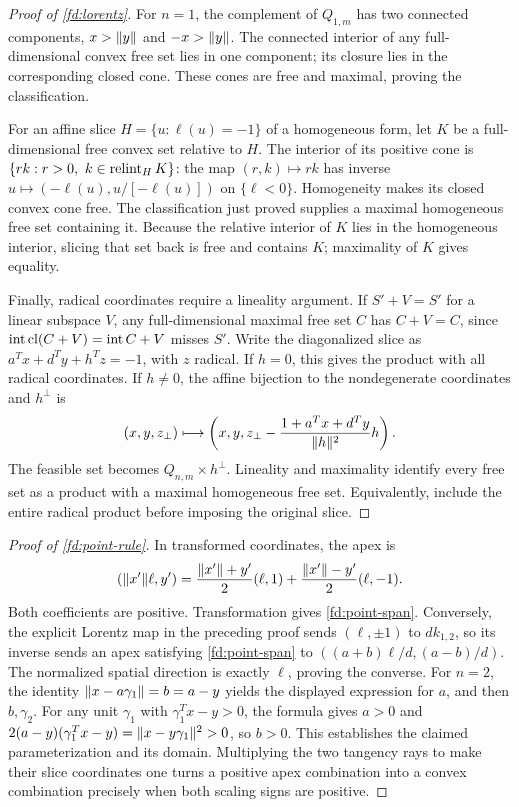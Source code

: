 \begin{proof}[Proof of \cref{fd:lorentz}]
For $n=1$, the complement of $Q_{1,m}$ has two connected components,
$x>\lVert y\rVert$ and $-x>\lVert y\rVert$. The connected interior of any
full-dimensional convex free set lies in one component; its
closure lies in the corresponding closed cone. These cones are
free and maximal, proving the classification.

For an affine slice $H=\{u:\ell(u)=-1\}$ of a homogeneous form,
let $K$ be a full-dimensional free convex set relative to $H$.
The interior of its positive cone is
$\{rk:r>0,\ k\in\operatorname{relint}_H K\}$: the map $(r,k)\mapsto rk$
has inverse $u\mapsto(-\ell(u),u/[-\ell(u)])$ on $\{\ell<0\}$.
Homogeneity makes its closed convex cone free. The classification
just proved supplies a maximal homogeneous free set containing it.
Because the relative interior of $K$ lies in the homogeneous
interior, slicing that set back is free and contains $K$;
maximality of $K$ gives equality.

Finally, radical coordinates require a lineality argument.
If $S'+V=S'$ for a linear subspace $V$, any full-dimensional maximal
free set $C$ has $C+V=C$, since
$\operatorname{int}\operatorname{cl}(C+V)=\operatorname{int} C+V$ misses $S'$. Write the diagonalized slice
as $a^Tx+d^Ty+h^Tz=-1$, with $z$ radical. If $h=0$, this gives
the product with all radical coordinates. If $h\ne0$, the affine
bijection to the nondegenerate coordinates and $h^\perp$ is
\[
 (x,y,z_\perp)\longmapsto
 \left(x,y,z_\perp-\frac{1+a^Tx+d^Ty}{\lVert h\rVert^2}h\right).
\]
The feasible set becomes $Q_{n,m}\times h^\perp$. Lineality and
maximality identify every free set as a product with a maximal
homogeneous free set. Equivalently, include the entire radical
product before imposing the original slice.
\end{proof}

\begin{proof}[Proof of \cref{fd:point-rule}]
\label{fd:point-rule-proof}
In transformed coordinates, the apex is
\[
 (\lVert x'\rVert\ell,y')
 =\frac{\lVert x'\rVert+y'}2(\ell,1)
  +\frac{\lVert x'\rVert-y'}2(\ell,-1).
\]
Both coefficients are positive. Transformation gives
\cref{fd:point-span}. Conversely, the explicit Lorentz map in
the preceding proof sends $(\ell,\pm1)$ to $d k_{1,2}$, so its
inverse sends an apex satisfying \cref{fd:point-span} to
$((a+b)\ell/d,(a-b)/d)$. The normalized spatial direction is
exactly $\ell$, proving the converse.
For $n=2$, the identity $\lVert x-a\gamma_1\rVert=b=a-y$ yields
the displayed expression for $a$, and then $b,\gamma_2$.
For any unit $\gamma_1$ with $\gamma_1^Tx-y>0$, the formula
gives $a>0$ and
$2(a-y)(\gamma_1^Tx-y)=\lVert x-y\gamma_1\rVert^2>0$,
so $b>0$. This establishes the claimed parameterization and
its domain. Multiplying the two tangency rays to make their
slice coordinates one turns a positive apex combination into
a convex combination precisely when both scaling signs are positive.
\end{proof}


